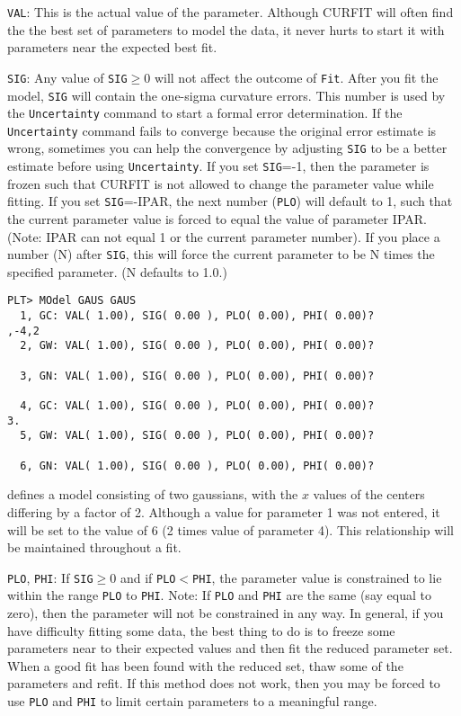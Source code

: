 \begin{description}
  \item {\tt VAL}:  This is the actual value of the parameter.  Although CURFIT
will often find  the the best set of parameters to model the data, it
never hurts to start it with parameters near the expected best fit.

  \item {\tt SIG}:  Any value of {\tt SIG}$\geq$0 will not affect the outcome of {\tt Fit}.  After
you fit the model, {\tt SIG} will contain the one-sigma curvature errors.
This number is used by the {\tt Uncertainty} command to start a formal error
determination.  If the {\tt Uncertainty} command fails to converge
because the original error estimate is wrong, sometimes you can help
the convergence by adjusting {\tt SIG} to be a better estimate before
using {\tt Uncertainty}.  If you set {\tt SIG}=-1, then the parameter
is frozen such that CURFIT is not allowed to change the parameter
value while fitting.  If you set {\tt SIG}=-IPAR, the next number
({\tt PLO}) will default to 1, such that the current parameter value
is forced to equal the value of parameter IPAR.  (Note:  IPAR can
not equal 1 or the current parameter number).  If you place a number
(N) after {\tt SIG}, this will force the current parameter to be N times
the specified parameter. (N defaults to 1.0.)

\begin{verbatim}
PLT> MOdel GAUS GAUS
  1, GC: VAL( 1.00), SIG( 0.00 ), PLO( 0.00), PHI( 0.00)?
,-4,2
  2, GW: VAL( 1.00), SIG( 0.00 ), PLO( 0.00), PHI( 0.00)?

  3, GN: VAL( 1.00), SIG( 0.00 ), PLO( 0.00), PHI( 0.00)?

  4, GC: VAL( 1.00), SIG( 0.00 ), PLO( 0.00), PHI( 0.00)?
3.
  5, GW: VAL( 1.00), SIG( 0.00 ), PLO( 0.00), PHI( 0.00)?

  6, GN: VAL( 1.00), SIG( 0.00 ), PLO( 0.00), PHI( 0.00)?

\end{verbatim}
defines a model consisting of two gaussians, with the $x$ values of
the centers differing by a factor of 2.  Although a value for parameter 1
was not entered, it will be set to the value of 6 (2 times
value of parameter 4).  This relationship will be maintained throughout
a fit.

  \item {\tt PLO}, {\tt PHI}:  If {\tt SIG}$\geq$0 and if {\tt PLO}$<${\tt PHI}, the parameter value is
constrained to lie within the range {\tt PLO} to {\tt PHI}.  Note:  If {\tt PLO} and {\tt PHI}
are the same (say equal to zero), then the parameter will not
be constrained in any way.  In general, if you have difficulty fitting
some data, the best thing to do is to freeze some parameters near
to their expected values and then fit the reduced parameter set.
When a good fit has been found with the reduced set, thaw some of
the parameters and refit.  If this method does not work, then you
may be forced to use {\tt PLO} and {\tt PHI} to limit certain parameters to a
meaningful range.
\end{description}

